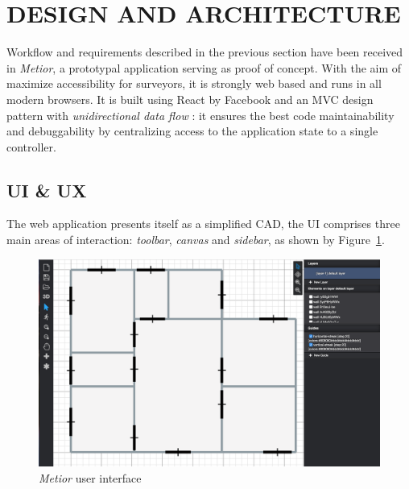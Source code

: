 \section{\uppercase{Design and Architecture}}
\label{sec:architecture}

\noindent Workflow and requirements described in the previous section have been received in \emph{Metior}, a prototypal application serving as proof of concept. With the aim of maximize accessibility for surveyors, it is strongly web based and runs in all modern browsers. It is built using React by Facebook and an MVC design pattern with \emph{unidirectional data flow} \cite{redux}:  it ensures the best code maintainability and debuggability by centralizing access to the application state to a single controller.

\subsection{UI \& UX}

The web application presents itself as a simplified CAD,  the UI comprises three main areas of interaction: \emph{toolbar}, \emph{canvas} and \emph{sidebar}, as shown by Figure~\ref{fig:ui}.

\begin{figure}[htbp] %
   \centering

   \includegraphics[width=1\linewidth]{images/2d}

   \caption{\emph{Metior} user interface}
   \label{fig:ui}
\end{figure}

